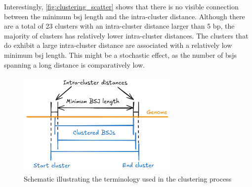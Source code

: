 Interestingly, \cref{fig:clustering_scatter} shows that there is no visible
connection between the minimum \gls{bsj} length and the intra-cluster distance.
Although there are a total of 23 clusters with an intra-cluster distance larger
than 5 bp, the majority of clusters has relatively lower intra-cluster
distances.
The clusters that do exhibit a large intra-cluster distance are associated with
a relatively low minimum \gls{bsj} length.
This might be a stochastic effect, as the number of \gls{bsj}s spanning a long
distance is comparatively low.

\begin{figure}[ht] \centering

    \includegraphics[width=0.7\textwidth]{chapters/4_results_and_discussion/figures/grouping.png}
    \caption{Schematic illustrating the terminology used in the clustering
        process}
    \label{fig:clustering_expl} \end{figure}

